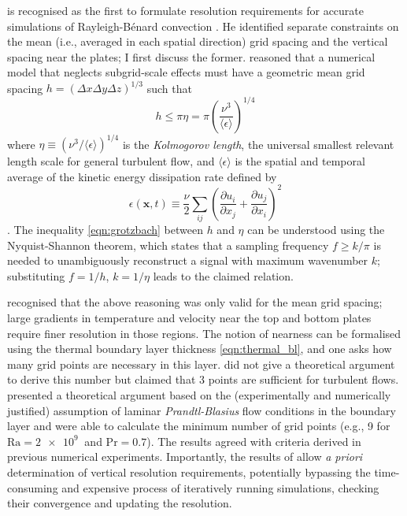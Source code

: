 \documentclass[titlepage,twoside]{article}
\numberwithin{equation}{section}
\newcommand{\pdiff}[2]{\frac{\partial #1}{\partial #2}}
\renewcommand\vec{\bm}
\newcommand{\prandtl}{\ensuremath{\mathrm{Pr}}}
\newcommand{\rayleigh}{\ensuremath{\mathrm{Ra}}}
\newcommand{\rb}{Rayleigh-B\'{e}nard}
\begin{document}
\textcite{grotzbach1983} is recognised as the first to formulate resolution
requirements for accurate simulations of \rb{} convection
\parencite{chilla2012,scheel2013}. He identified separate constraints on the
mean (i.e., averaged in each spatial direction) grid spacing and the vertical
spacing near the plates; I first discuss the former.
\citeauthor{grotzbach1983} reasoned that a numerical model that neglects
subgrid-scale effects must have a geometric mean grid spacing $h = (\Delta x
\Delta y \Delta z)^{1/3}$ such that
\begin{equation}
    \label{eqn:grotzbach}
    h \leq \pi \eta = \pi \left(
        \frac{\nu^3}{\langle \epsilon \rangle}
    \right)^{1/4}
\end{equation}
where $\eta \equiv (\nu^3/\langle \epsilon \rangle)^{1/4}$ is the \emph{Kolmogorov length}, the
universal smallest relevant length scale for general turbulent flow, and
$\langle \epsilon \rangle$ is the spatial and temporal average of the kinetic
energy dissipation rate defined by
\begin{equation}
    \label{eqn:kinetic_dissipation}
    \epsilon(\vec{x}, t) \equiv \frac{\nu}{2} \sum_{ij} \left(
        \pdiff{u_i}{x_j} + \pdiff{u_j}{x_i}
    \right)^2
\end{equation}
\parencite{chilla2012}. The inequality \cref{eqn:grotzbach} between $h$ and $\eta$ can be
understood using the Nyquist-Shannon theorem, which states that a
sampling frequency $f \geq k/\pi$ is needed to unambiguously reconstruct
a signal with maximum wavenumber $k$; substituting $f = 1/h$, $k =
1/\eta$ leads to the claimed relation.

\citeauthor{grotzbach1983} recognised that the above reasoning was only valid
for the mean grid spacing; large gradients in temperature and velocity near the
top and bottom plates require finer resolution in those regions. The notion of
nearness can be formalised using the thermal boundary layer thickness
\cref{eqn:thermal_bl}, and one asks how many grid points are necessary in this
layer. \citeauthor{grotzbach1983} did not give a theoretical argument to derive
this number but claimed that 3 points are sufficient for turbulent flows.
\textcite{shishkina2010} presented a theoretical argument based on the
(experimentally and numerically justified) assumption of laminar
\emph{Prandtl-Blasius} flow conditions in the boundary layer and were able to
calculate the minimum number of grid points (e.g., 9 for $\rayleigh =
\SI{2e9}{}$ and $\prandtl = 0.7$). The results agreed with criteria derived in
previous numerical experiments. Importantly, the results of
\citeauthor{shishkina2010} allow \emph{a priori} determination of vertical
resolution requirements, potentially bypassing the time-consuming and expensive
process of iteratively running simulations, checking their convergence and
updating the resolution.
\end{document}
